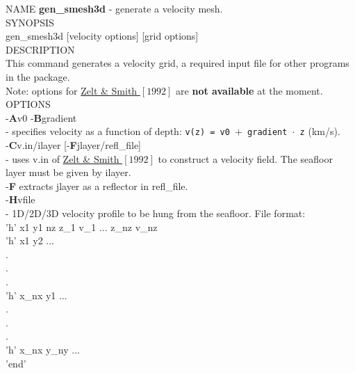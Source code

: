 \documentclass[twoside,final,onecolumn]{article}
\newcommand{\forceindent}{\leavevmode{\parindent=1em\indent}}
\begin{document}
NAME \textbf{gen\_smesh3d} - generate a velocity mesh.\\[6pt]
SYNOPSIS \\
\forceindent gen\_smesh3d [velocity options] [grid options]\\[6pt]
DESCRIPTION\\ 
\forceindent This command generates a velocity grid, a required input file for other programs in the package.\\
\forceindent Note: options for \href{http://www.dx.doi.org/10.1111/j.1365-246X.1992.tb00836.x}{Zelt \& Smith $[1992]$} are \textbf{not available} at the moment.\\[6pt]
OPTIONS\\
\forceindent -\textbf{A}v0 -\textbf{B}gradient\\ 
\forceindent\forceindent- specifies velocity as a function of depth: \texttt{v(z) = v0 $+$ gradient $\cdot$ z} (km/s).\\[6pt]
\forceindent -\textbf{C}v.in/ilayer [-\textbf{F}jlayer/refl\_file]\\
\forceindent\forceindent - uses v.in of \href{http://www.dx.doi.org/10.1111/j.1365-246X.1992.tb00836.x}{Zelt \& Smith $[1992]$} 
to construct a velocity field. The seafloor layer must be given by ilayer.\\ 
\forceindent\forceindent -\textbf{F} extracts jlayer as a reflector in refl\_file.\\[6pt]
\forceindent -\textbf{H}vfile \\
\forceindent\forceindent - 1D/2D/3D velocity profile to be hung from the seafloor. File format:\\
\newline
\forceindent\forceindent 'h' x1 y1 nz z\_1 v\_1 ... z\_nz v\_nz\\
\forceindent\forceindent 'h' x1 y2 ... \\
\forceindent\forceindent .\\
\forceindent\forceindent .\\
\forceindent\forceindent .\\
\forceindent\forceindent 'h' x\_nx y1 ...\\
\forceindent\forceindent .\\
\forceindent\forceindent .\\
\forceindent\forceindent .\\
\forceindent\forceindent 'h' x\_nx y\_ny ...\\
\forceindent\forceindent 'end' \\
\newline
\end{document}
